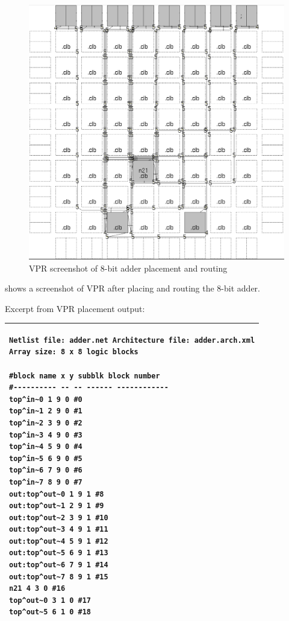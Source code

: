 \begin{figure}[!h]
	\centering
	\includegraphics[scale=0.5]{vpr-adder.png}
	\caption{VPR screenshot of 8-bit adder placement and routing}
	\label{adder}
\end{figure}

 shows a screenshot of VPR after placing and routing the 8-bit adder.

Excerpt from VPR placement output:

\begin{tabular}{|p{13cm}|}
\hline
\begin{verbatim}
Netlist file: adder.net Architecture file: adder.arch.xml
Array size: 8 x 8 logic blocks

#block name x y subblk block number
#---------- -- -- ------ ------------
top^in~0 1 9 0 #0
top^in~1 2 9 0 #1
top^in~2 3 9 0 #2
top^in~3 4 9 0 #3
top^in~4 5 9 0 #4
top^in~5 6 9 0 #5
top^in~6 7 9 0 #6
top^in~7 8 9 0 #7
out:top^out~0 1 9 1 #8
out:top^out~1 2 9 1 #9
out:top^out~2 3 9 1 #10
out:top^out~3 4 9 1 #11
out:top^out~4 5 9 1 #12
out:top^out~5 6 9 1 #13
out:top^out~6 7 9 1 #14
out:top^out~7 8 9 1 #15
n21 4 3 0 #16
top^out~0 3 1 0 #17
top^out~5 6 1 0 #18
\end{verbatim}
\\ \hline
\end{tabular}

